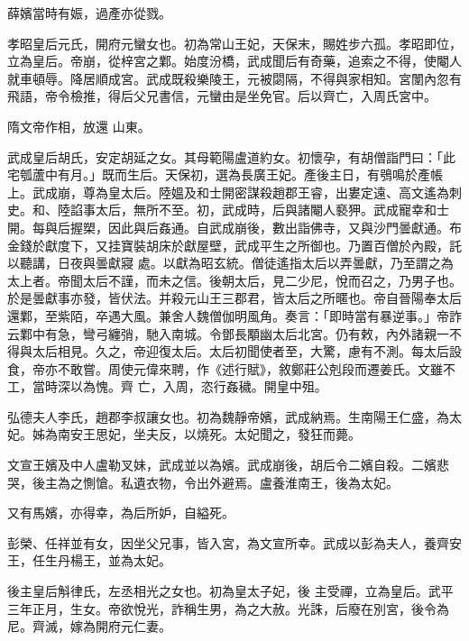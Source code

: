 \begin{pinyinscope}
 薛嬪當時有娠，過產亦從戮。



 孝昭皇后元氏，開府元蠻女也。初為常山王妃，天保末，賜姓步六孤。孝昭即位，立為皇后。帝崩，從梓宮之鄴。始度汾橋，武成聞后有奇藥，追索之不得，使閹人就車頓辱。降居順成宮。武成既殺樂陵王，元被閟隔，不得與家相知。宮闈內忽有飛語，帝令檢推，得后父兄書信，元蠻由是坐免官。后以齊亡，入周氏宮中。



 隋文帝作相，放還
 山東。



 武成皇后胡氏，安定胡延之女。其母範陽盧道約女。初懷孕，有胡僧詣門曰：「此宅瓠蘆中有月。」既而生后。天保初，選為長廣王妃。產後主日，有鴞鳴於產帳上。武成崩，尊為皇太后。陸媼及和士開密謀殺趙郡王睿，出婁定遠、高文遙為刺史。和、陸諂事太后，無所不至。初，武成時，后與諸閹人褻狎。武成寵幸和士開。每與后握槊，因此與后姦通。自武成崩後，數出詣佛寺，又與沙門曇獻通。布金錢於獻度下，又挂寶裝胡床於獻屋壁，武成平生之所御也。乃置百僧於內殿，託以聽講，日夜與曇獻寢
 處。以獻為昭玄統。僧徒遙指太后以弄曇獻，乃至謂之為太上者。帝聞太后不謹，而未之信。後朝太后，見二少尼，悅而召之，乃男子也。於是曇獻事亦發，皆伏法。并殺元山王三郡君，皆太后之所暱也。帝自晉陽奉太后還鄴，至紫陌，卒遇大風。兼舍人魏僧伽明風角。奏言：「即時當有暴逆事。」帝詐云鄴中有急，彎弓纏弰，馳入南城。令鄧長顒幽太后北宮。仍有敕，內外諸親一不得與太后相見。久之，帝迎復太后。太后初聞使者至，大驚，慮有不測。每太后設食，帝亦不敢嘗。周使元偉來聘，作《述行賦》，敘鄭莊公剋段而遷姜氏。文雖不工，當時深以為愧。齊
 亡，入周，恣行姦穢。開皇中殂。



 弘德夫人李氏，趙郡李叔讓女也。初為魏靜帝嬪，武成納焉。生南陽王仁盛，為太妃。姊為南安王思妃，坐夫反，以燒死。太妃聞之，發狂而薨。



 文宣王嬪及中人盧勒叉妹，武成並以為嬪。武成崩後，胡后令二嬪自殺。二嬪悲哭，後主為之惻愴。私遺衣物，令出外避焉。盧養淮南王，後為太妃。



 又有馬嬪，亦得幸，為后所妒，自縊死。



 彭榮、任祥並有女，因坐父兄事，皆入宮，為文宣所幸。武成以彭為夫人，養齊安王，任生丹楊王，並為太妃。



 後主皇后斛律氏，左丞相光之女也。初為皇太子妃，後
 主受禪，立為皇后。武平三年正月，生女。帝欲悅光，詐稱生男，為之大赦。光誅，后廢在別宮，後令為尼。齊滅，嫁為開府元仁妻。




\end{pinyinscope}
